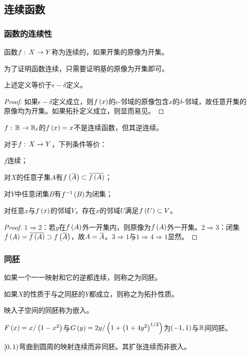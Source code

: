 \documentclass{ctexrep}
\begin{document}
  \subsection{连续函数}
  \subsubsection{函数的连续性}
  \begin{definition}
    函数$f:\, X \rightarrow Y$称为连续的，如果开集的原像为开集。
  \end{definition}
  为了证明函数连续，只需要证明基的原像为开集即可。
  \begin{ex}
  \label{ex:epsd}
    上述定义等价于$\epsilon-\delta$定义。
  \end{ex}
  \begin{proof}
    如果$\epsilon-\delta$定义成立，则$f\left(x\right)$的$\epsilon$-邻域的原像包含$x$的$\delta$-邻域，故任意开集的原像均为开集。如果拓扑定义成立，则显而易见。
  \end{proof}
  \begin{ex}
    $f:\, \mathbb{R} \rightarrow \mathbb{R}_\ell$的$f\left(x\right)=x$不是连续函数，但其逆连续。
  \end{ex}
  \begin{theorem}
  \label{thm:contineq}
    对于$f:\, X \rightarrow Y$，下列条件等价：
    \begin{cenum}
      \item $f$连续；
      \item 对$X$的任意子集$A$有$f\pare{\clo{A}}\subset\clo{f\pare{A}}$；
      \item 对$Y$中任意闭集$B$有$f^{-1}\left(B\right)$为闭集；
      \item 对任意$x$与$f\left(x\right)$的邻域$V$，存在$x$的邻域$U$满足$f\left(U\right)\subset{V}$。
    \end{cenum}
  \end{theorem}
  \begin{proof}
    $1\Rightarrow 2$：若$y$在$f\left(A\right)$外一开集内，则原像为$f\left(A\right)$外一开集。$2\Rightarrow 3$：闭集$f\pare{A} = \clo{f\pare{A}}\supset f\pare{\clo{A}}$，故$A=\clo{A}$。$3\Rightarrow 1$与$1\Rightarrow 4 \Rightarrow1$显然。
  \end{proof}
  \subsubsection{同胚}
  \begin{definition}
    如果一个一一映射和它的逆都连续，则称之为同胚。
  \end{definition}
  \begin{definition}
    如果$X$的性质于与之同胚的$Y$都成立，则称之为拓扑性质。
  \end{definition}
  \begin{definition}
    映入子空间的同胚称为嵌入。
  \end{definition}
  \begin{ex}
    $F\left(x\right)=x/\left(1-x^2\right)$与$G\left(y\right)=2y/\left(1+\left(1+4y^2\right)^{1/2}\right)$为$\left(-1,1\right)$与$\mathbb{R}$间同胚。
  \end{ex}
  \begin{ex}
    $\left[0,1\right)$弯曲到圆周的映射连续而非同胚。其扩张连续而非嵌入。
  \end{ex}
\end{document}
